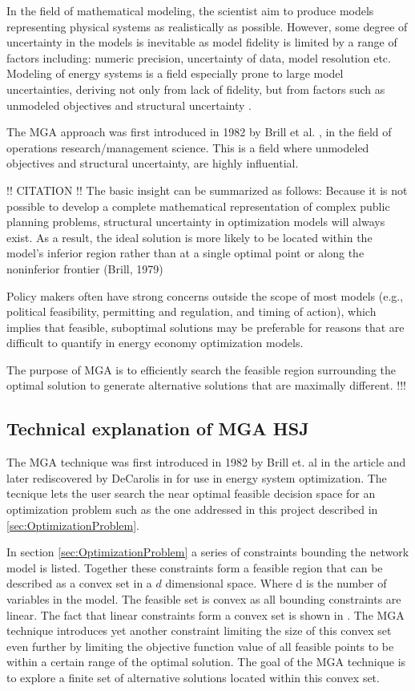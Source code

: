 In the field of mathematical modeling, the scientist aim to produce models representing physical systems as realistically as possible. However, some degree of uncertainty in the models is inevitable as model fidelity is limited by a range of factors including: numeric precision, uncertainty of data, model resolution etc. Modeling of energy systems is a field especially prone to large model uncertainties, deriving not only from lack of fidelity, but from factors such as unmodeled objectives and structural uncertainty \cite{DeCarolis_MGA}. 

The MGA approach was first introduced in 1982 by Brill et al. \cite{Brill_MGA_1982}, in the field of operations research/management science. This is a field where unmodeled objectives and structural uncertainty, are highly influential. 

!! CITATION !!
The basic insight can be
summarized as follows: Because it is not possible to develop a complete
mathematical representation of complex public planning problems,
structural uncertainty in optimization models will always exist. As a
result, the ideal solution is more likely to be located within the model's
inferior region rather than at a single optimal point or along the noninferior frontier (Brill, 1979)

Policy makers often have strong concerns outside the scope of most models
(e.g., political feasibility, permitting and regulation, and timing of
action), which implies that feasible, suboptimal solutions may be
preferable for reasons that are difficult to quantify in energy economy
optimization models.

The purpose of MGA is to efficiently search the feasible
region surrounding the optimal solution to generate alternative
solutions that are maximally different. !!!



\subsection{Technical explanation of MGA HSJ}

The MGA technique was first introduced in 1982 by Brill et. al in the article \cite{Brill_MGA_1982} and later rediscovered by DeCarolis in \cite{DeCarolis_MGA} for use in energy system optimization. The tecnique lets the user search the near optimal feasible decision space for an optimization problem such as the one addressed in this project described in \ref{sec:OptimizationProblem}. 

In section \ref{sec:OptimizationProblem} a series of constraints bounding the network model is listed. Together these constraints form a feasible region that can be described as a convex set in a $d$ dimensional space. Where d is the number of variables in the model. The feasible set is convex as all bounding constraints are linear. The fact that linear constraints form a convex set is shown in \cite{ConvexOpimization}. The MGA technique introduces yet another constraint limiting the size of this convex set even further by limiting the objective function value of all feasible points to be within a certain range of the optimal solution. The goal of the MGA technique is to explore a finite set of alternative solutions located within this convex set. 

